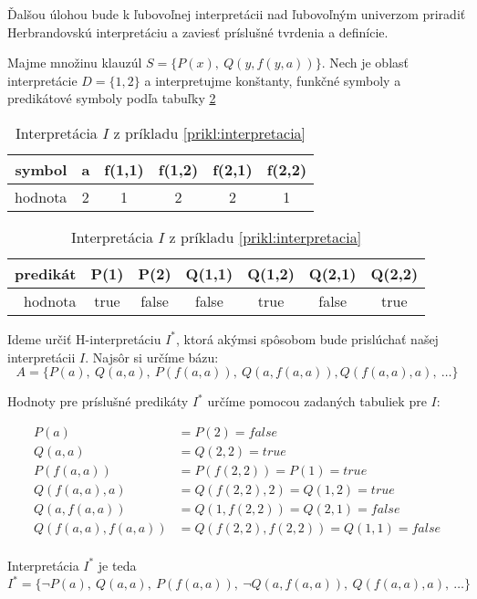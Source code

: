 \medskip
Ďalšou úlohou bude k ľubovoľnej interpretácii nad ľubovoľným univerzom
priradiť Herbrandovskú interpretáciu a zaviesť príslušné tvrdenia a definície.

\begin{priklad}
    \label{prikl:interpretacia}
    Majme množinu klauzúl $S = \{ P(x),\ Q(y, f(y,a)) \}$.
    Nech je oblasť interpretácie $D = \{1,2\}$ a interpretujme
    konštanty, funkčné symboly a predikátové symboly podľa tabuľky
    \ref{tab:priklad-interpretacia}

    \begin{table}[h]
        \centering
        \begin{tabular}{|r||c|c|c|c|c|}
            \hline
            symbol & a & f(1,1) & f(1,2) & f(2,1) & f(2,2) \\
            \hline
            hodnota & 2 & 1 & 2 & 2 & 1 \\
            \hline
        \end{tabular}
        
        \medskip
        \begin{tabular}{|r||c|c|c|c|c|c|}
            \hline
            predikát & P(1) & P(2) & Q(1,1) & Q(1,2) & Q(2,1) & Q(2,2) \\
            \hline
            hodnota & true & false & false & true & false & true \\
            \hline
        \end{tabular}
        \caption{Interpretácia $I$ z príkladu
          \ref{prikl:interpretacia}}
        \label{tab:priklad-interpretacia}
    \end{table}

    Ideme určiť H-interpretáciu $I^*$, ktorá akýmsi spôsobom bude
    prislúchať našej interpretácii $I$. Najsôr si určíme bázu:
    \begin{equation*}
        A=\{ P(a),\ Q(a,a),\ P(f(a,a)),\ Q(a,f(a,a)),
            Q(f(a,a), a),\ \ldots \}
    \end{equation*}

    Hodnoty pre príslušné predikáty $I^*$ určíme pomocou zadaných tabuliek
    pre $I$:

    \begin{align*}
        P(a) &= P(2) = false \\
        Q(a,a) &= Q(2,2) = true\\
        P(f(a,a)) &= P(f(2,2)) = P(1) =true \\
        Q(f(a,a),a) &= Q(f(2,2),2) = Q(1,2) =true \\
        Q(a,f(a,a)) &= Q(1,f(2,2)) = Q(2,1) =false \\
        Q(f(a,a),f(a,a)) &= Q(f(2,2), f(2,2)) = Q(1,1) =false \\
    \end{align*}

    Interpretácia $I^*$ je teda
    \begin{equation*}
        I^* = \{ \neg P(a),\ Q(a,a),\ P(f(a,a)),\ 
            \neg Q(a,f(a,a)),\ Q(f(a,a),a),\ \ldots \}
    \end{equation*}
\end{priklad}

